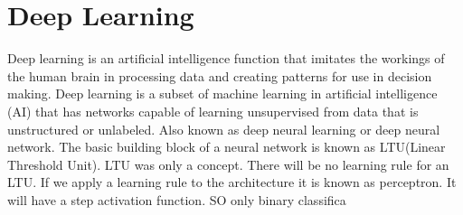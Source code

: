 \chapter{Deep Learning}
\par
    Deep learning is an artificial intelligence function that imitates the workings of the human brain in processing data and creating patterns for use in decision making. Deep learning is a subset of machine learning in artificial intelligence (AI) that has networks capable of learning unsupervised from data that is unstructured or unlabeled. Also known as deep neural learning or deep neural network. The basic building block of a neural network is known as LTU(Linear Threshold Unit). LTU was only a concept. There will be no learning rule for an LTU. If we apply a learning rule to the architecture it is known as perceptron. It will have a step activation function. SO only binary classifica